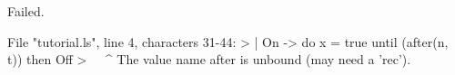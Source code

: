 \runverbatimfalse
{}
\begin{RunVerbatimMsg}
Failed.
\end{RunVerbatimMsg}
\begin{RunVerbatimErr}
File "tutorial.ls", line 4, characters 31-44:
>   | On  -> do x = true  until (after(n, t)) then Off
>                               ^^^^^^^^^^^^^
The value name after is unbound (may need a 'rec').
\end{RunVerbatimErr}
